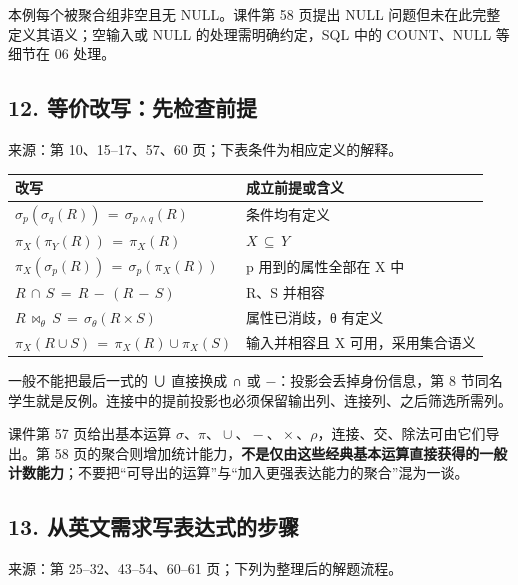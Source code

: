 本例每个被聚合组非空且无 NULL。课件第 58 页提出 NULL 问题但未在此完整定义其语义；空输入或 NULL 的处理需明确约定，SQL 中的 COUNT、NULL 等细节在 06 处理。

\subsection{12. 等价改写：先检查前提}\label{05_relational_algebra_zh-ux7b49ux4ef7ux6539ux5199ux5148ux68c0ux67e5ux524dux63d0}

来源：第 10、15--17、57、60 页；下表条件为相应定义的解释。

\begin{longtable}[]{@{}ll@{}}
\toprule\noalign{}
改写 & 成立前提或含义 \\
\midrule\noalign{}
\endhead
\bottomrule\noalign{}
\endlastfoot
\(\sigma _{p}(\sigma _{q}(R))\,=\,\sigma _{p\land q}(R)\) & 条件均有定义 \\
\(\pi _{X}(\pi _{Y}(R))\,=\,\pi _{X}(R)\) & \(X\,\subseteq \,Y\) \\
\(\pi _{X}(\sigma _{p}(R))\,=\,\sigma _{p}(\pi _{X}(R))\) & p 用到的属性全部在 X 中 \\
\(R\,\cap \,S\,=\,R\,- \,(R\,- \,S)\) & R、S 并相容 \\
\(R\,\bowtie _\theta \,S\,=\,\sigma _\theta (R\times S)\) & 属性已消歧，θ 有定义 \\
\(\pi _{X}(R\cup S)\,=\,\pi _{X}(R)\cup \pi _{X}(S)\) & 输入并相容且 X 可用，采用集合语义 \\
\end{longtable}

一般不能把最后一式的 ∪ 直接换成 ∩ 或 −：投影会丢掉身份信息，第 8 节同名学生就是反例。连接中的提前投影也必须保留输出列、连接列、之后筛选所需列。

课件第 57 页给出基本运算 \(\sigma \text{、}\pi \text{、}\cup \text{、}- \text{、}\times \text{、}\rho \)，连接、交、除法可由它们导出。第 58 页的聚合则增加统计能力，\textbf{不是仅由这些经典基本运算直接获得的一般计数能力}；不要把``可导出的运算''与``加入更强表达能力的聚合''混为一谈。

\subsection{13. 从英文需求写表达式的步骤}\label{05_relational_algebra_zh-ux4eceux82f1ux6587ux9700ux6c42ux5199ux8868ux8fbeux5f0fux7684ux6b65ux9aa4}

来源：第 25--32、43--54、60--61 页；下列为整理后的解题流程。

